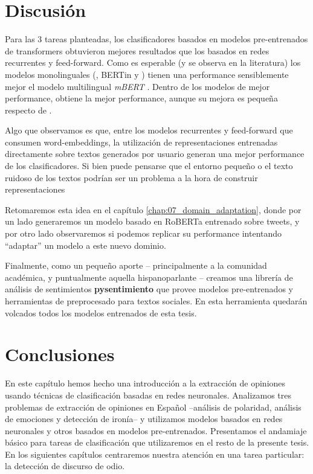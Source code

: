 


%
%
%

\section{Discusión}

Para las 3 tareas planteadas, los clasificadores basados en modelos pre-entrenados de transformers obtuvieron mejores resultados que los basados en redes recurrentes y feed-forward. Como es esperable (y se observa en la literatura) los modelos monolinguales (\roberta{}, BERTin y \beto{}) tienen una performance sensiblemente mejor el modelo multilingual \emph{mBERT} . Dentro de los modelos de mejor performance, \roberta{} obtiene la mejor performance, aunque su mejora es pequeña respecto de \beto{}.

Algo que observamos es que, entre los modelos recurrentes y feed-forward que consumen word-embeddings, la utilización de representaciones entrenadas directamente sobre textos generados por usuario generan una mejor performance de los clasificadores. Si bien puede pensarse que el entorno pequeño o el texto ruidoso de los textos podrían ser un problema a la hora de construir representaciones

Retomaremos esta idea en el capítulo \ref{chap:07_domain_adaptation}, donde por un lado generaremos un modelo basado en RoBERTa entrenado sobre tweets, y por otro lado observaremos si podemos replicar su performance intentando ``adaptar'' un modelo \beto{} a este nuevo dominio.

Finalmente, como un pequeño aporte -- principalmente a la comunidad académica, y puntualmente aquella hispanoparlante -- creamos una librería de análisis de sentimientos \textbf{pysentimiento} que provee modelos pre-entrenados y herramientas de preprocesado para textos sociales. En esta herramienta quedarán volcados todos los modelos entrenados de esta tesis.

\section{Conclusiones}

En este capítulo hemos hecho una introducción a la extracción de opiniones usando técnicas de clasificación basadas en redes neuronales. Analizamos tres problemas de extracción de opiniones en Español --análisis de polaridad, análisis de emociones y detección de ironía-- y utilizamos modelos basados en redes neuronales y otros basados en modelos pre-entrenados. Presentamos el andamiaje básico para tareas de clasificación que utilizaremos en el resto de la presente tesis. En los siguientes capítulos centraremos nuestra atención en una tarea particular: la detección de discurso de odio.

